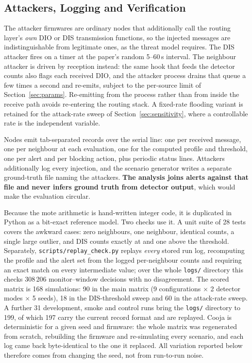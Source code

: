 \documentclass[11pt, a4paper]{article}
\begin{document}
\subsection{Attackers, Logging and Verification}

The attacker firmwares are ordinary nodes that additionally call the routing layer's \textit{own} DIO or DIS transmission functions, so the injected messages are indistinguishable from legitimate ones, as the threat model requires. The DIS attacker fires on a timer at the paper's random 5--60\,s interval. The neighbour attacker is driven by reception instead: the same hook that feeds the detector counts also flags each received DIO, and the attacker process drains that queue a few times a second and re-emits, subject to the per-source limit of Section~\ref{sec:params}. Re-emitting from the process rather than from inside the receive path avoids re-entering the routing stack. A fixed-rate flooding variant is retained for the attack-rate sweep of Section~\ref{sec:sensitivity}, where a controllable rate is the independent variable.

Nodes emit tab-separated records over the serial line: one per received message, one per neighbour at each evaluation, one for the computed profile and threshold, one per alert and per blocking action, plus periodic status lines. Attackers additionally log every injection, and the scenario generator writes a separate ground-truth file naming the attackers. \textbf{The analysis joins alerts against that file and never infers ground truth from detector output}, which would make the evaluation circular.

Because the mote arithmetic is hand-written integer code, it is duplicated in Python as a bit-exact reference model. Two checks use it. A unit suite of 28 tests covers the awkward cases: zero neighbours, one neighbour, identical counts, a single large outlier, and DIS counts exactly at and one above the threshold. Separately, \texttt{scripts/replay\_check.py} replays \textit{every} stored run log, recomputing the profile and the alert set from the logged per-neighbour counts and requiring an exact match on every intermediate value; over the whole \texttt{logs/} directory this checks 308\,206 monitor--window decisions with no disagreement. The scored matrix is 168 simulations: 90 in the main matrix (9 configurations $\times$ 2 detector modes $\times$ 5 seeds), 18 in the DIS-threshold sweep and 60 in the attack-rate sweep. A further 31 development, smoke and control runs bring the \texttt{logs/} directory to 199, of which 197 carry the current record format and are replayed. Cooja is deterministic for a given seed and firmware: the whole matrix was regenerated from scratch, rebuilding the firmware and re-simulating every scenario, and each log came back byte-identical to the one it replaced. All variation reported below therefore comes from changing the seed, not from run-to-run noise.
\end{document}

